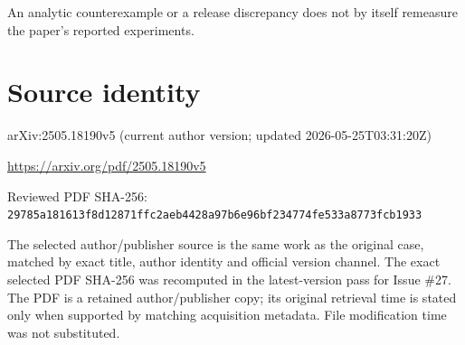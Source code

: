 \documentclass[11pt]{article}
\begin{document}
An analytic counterexample or a release discrepancy does not by itself remeasure the paper’s reported experiments.\par

\section*{Source identity}

arXiv:2505.18190v5 (current author version; updated 2026-05-25T03:31:20Z)

\url{https://arxiv.org/pdf/2505.18190v5}

Reviewed PDF SHA-256: \nolinkurl{29785a181613f8d12871ffc2aeb4428a97b6e96bf234774fe533a8773fcb1933}

The selected author/publisher source is the same work as the original case, matched by exact title, author identity and official version channel. The exact selected PDF SHA-256 was recomputed in the latest-version pass for Issue \#27. The PDF is a retained author/publisher copy; its original retrieval time is stated only when supported by matching acquisition metadata. File modification time was not substituted.
\end{document}
